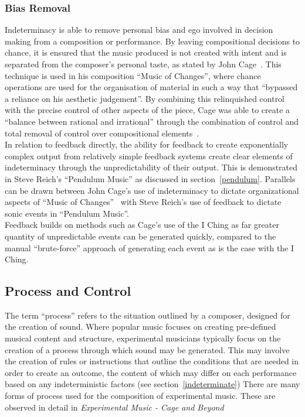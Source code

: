 \documentclass[titlepage]{scrartcl}
\begin{document}
    \subsubsection{Bias Removal}
    Indeterminacy is able to remove personal bias and ego involved in decision
    making from a composition or performance. By leaving compositional
    decisions to chance, it is ensured that the music produced is not created
    with intent and is separated from the composer's personal taste, as stated
    by John Cage~\parencite[p.381]{holmes2012eaem}. This technique is used in
    his composition ``Music of Changes'', where chance operations are used for
    the organisation of material in such a way that ``bypassed a reliance on his
    aesthetic judgement''. By combining this relinquished control with the
    precise control of other aspects of the piece, Cage was able to create a
    ``balance between rational and irrational'' through the combination of
    control and total removal of control over compositional
    elements~\parencite[p.97-98]{jc2009co}.\\
    In relation to feedback directly, the ability for feedback to create
    exponentially complex output from relatively simple feedback systems
    create clear elements of indeterminacy through the unpredictability of
    their output. This is demonstrated in Steve Reich's ``Pendulum Music'' as
    discussed in section~\ref{pendulum}. Parallels can be drawn between John
    Cage's use of indeterminacy to dictate organizational aspects of ``Music of
    Changes''~\citeyearpar{cage1951mfc} with Steve Reich's use of feedback to dictate sonic events in
    ``Pendulum Music''.\\
    Feedback builds on methods such as Cage's use of the I Ching as far greater
    quantity of unpredictable events can be generated quickly, compared to the
    manual ``brute-force'' approach of generating each event as is the case
    with the I Ching. 
    \subsection{Process and Control}
    The term ``process'' refers to the situation outlined by a composer,
    designed for the creation of sound. Where popular music focuses on creating
    pre-defined musical content and structure, experimental musicians typically focus on
    the creation of a process through which sound may be generated. This may
    involve the creation of rules or instructions that outline the conditions
    that are needed in order to create an outcome, the content of which may
    differ on each performance based on any indeterministic factors (see
    section~\ref{indeterminate}) There are many forms of process used for the
    composition of experimental music. These are observed in detail in
    \textit{Experimental Music - Cage and
    Beyond}~\parencite[p.4-14]{nyman1999em}
\end{document}
